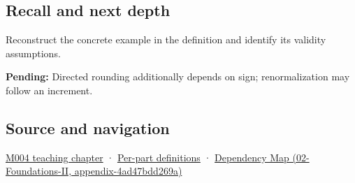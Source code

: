 \subsection{Recall and next depth}\label{recall-and-next-depth}

Reconstruct the concrete example in the definition and identify its validity assumptions.

\textbf{Pending:} Directed rounding additionally depends on sign; renormalization may follow an increment.

\subsection{Source and navigation}\label{source-and-navigation}

\href{Continuous\%20Notes/Computing\%20Foundations\%20-\%20From\%20Bits\%20to\%20C++\%20and\%20Systems\%20APIs\#A\%20stretching\%20ruler\%20for\%20real-valued\%20quantities}{M004 teaching chapter} · \hyperref[appendix-fd090d982a15]{Per-part definitions} · \href{}{Dependency Map (02-Foundations-II, appendix-4ad47bdd269a)}
